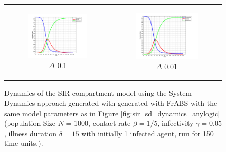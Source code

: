 \begin{figure}
\begin{center}
\begin{tabular}{c c}
		\begin{subfigure}[b]{0.5\textwidth}
			\centering
			\includegraphics[width=.7\textwidth, angle=0]{./../shared/fig/SIR_SD_DYNAMICS_1000Agents_01dt.png}
			\caption{$\Delta$ 0.1}
			\label{fig:hac_seq}
		\end{subfigure}
		&
		\begin{subfigure}[b]{0.5\textwidth}
			\centering
			\includegraphics[width=.7\textwidth, angle=0]{./../shared/fig/SIR_SD_DYNAMICS_1000Agents_001dt.png}
			\caption{$\Delta$ 0.01}
			\label{fig:hac_seq}
		\end{subfigure}
	\end{tabular}
	
	\caption{Dynamics of the SIR compartment model using the System Dynamics approach generated with generated with FrABS with the same model parameters as in Figure \ref{fig:sir_sd_dynamics_anylogic} (population Size $N$ = 1000, contact rate $\beta = 1/5$, infectivity $\gamma = 0.05$, illness duration $\delta = 15$ with initially 1 infected agent, run for 150 time-units.).} 
	\label{fig:sir_sd_dynamics_frabs}
\end{center}
\end{figure}

